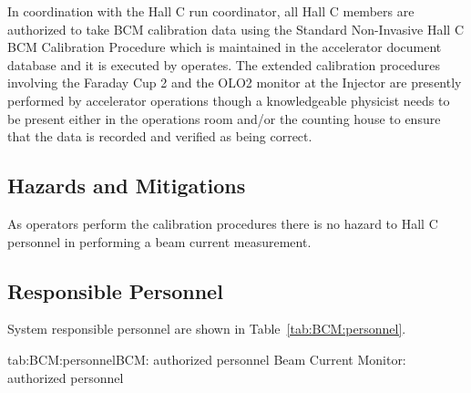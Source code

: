 {\begin{safetyen}{10}{10}

In coordination with the Hall C run coordinator, all Hall C members
are authorized to take BCM calibration data using the Standard
Non-Invasive Hall C BCM Calibration Procedure which is maintained in
the accelerator document database and it is executed by operates. The
extended calibration procedures involving the Faraday Cup 2 and the
OLO2 monitor at the Injector are presently performed by accelerator
operations though a knowledgeable physicist needs to be present either
in the operations room and/or the counting house to ensure that the
data is recorded and verified as being correct.


\subsection{Hazards and Mitigations}

As operators perform the calibration procedures there is no hazard to
Hall C personnel in performing a beam current measurement.

\subsection{Responsible Personnel}
System responsible personnel are shown in Table~\ref{tab:BCM:personnel}.
\begin{namestab}{tab:BCM:personnel}{BCM: authorized personnel}{%
   Beam Current Monitor: authorized personnel}
\end{namestab}
\end{safetyen}

}
